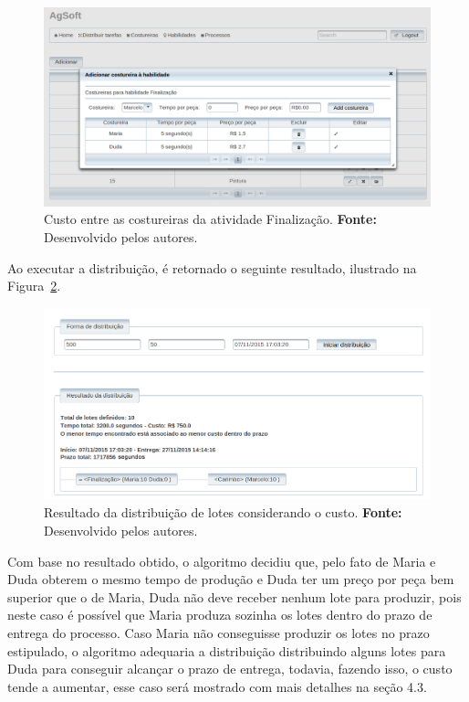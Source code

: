 \begin{figure}[h!]
	\centerline{\includegraphics[width=14.7cm]{./imagens/custo_entre_costureiras_teste2.png}}
	\caption[Custo entre as costureiras da atividade Finalização.]
	{Custo entre as costureiras da atividade Finalização. \textbf{Fonte:}
	Desenvolvido pelos autores.}
	\label{fig:custo_entre_costureiras}
\end{figure}

\par Ao executar a distribuição, é retornado o seguinte resultado, ilustrado na
Figura~\ref{fig:resultado_custo}.



\begin{figure}[h!]
	\centerline{\includegraphics[width=13cm]{./imagens/resultado_teste2.png}}
	\caption[Resultado da distribuição de lotes considerando o custo.]
	{Resultado da distribuição de lotes considerando o custo. \textbf{Fonte:}
	Desenvolvido pelos autores.}
	\label{fig:resultado_custo}
\end{figure}

\par Com base no resultado obtido, o algoritmo decidiu que, pelo fato de
Maria e Duda obterem o mesmo tempo de produção e Duda ter um preço por peça
bem superior que o de Maria, Duda não deve receber nenhum lote para produzir, pois neste
caso é possível que Maria produza sozinha os lotes dentro do prazo de entrega do
processo. Caso Maria não conseguisse produzir os lotes no prazo estipulado, o
algoritmo adequaria a distribuição distribuindo alguns lotes para Duda para
conseguir alcançar o prazo de entrega, todavia, fazendo isso, o custo tende a
aumentar, esse caso será mostrado com mais detalhes na seção 4.3.

